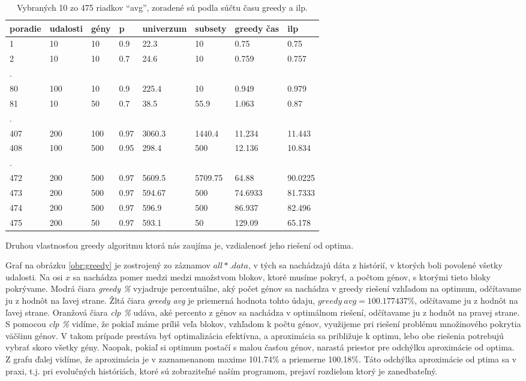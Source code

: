 \begin{table}[t]

\label{tab:data}
\begin{center}
\begin{tabular}{llllllll}
poradie&udalosti&gény&p&univerzum&subsety&greedy čas&ilp\\
\hline
1&10&10&0.9&22.3&10&0.75&0.75\\
2&10&10&0.7&24.6&10&0.759&0.757\\
.\\
80&100&10&0.9&225.4&10&0.949&0.979\\
81&10&50&0.7&38.5&55.9&1.063&0.87\\
.\\
407&200&100&0.97&3060.3&1440.4&11.234&11.443\\
408&100&500&0.95&298.4&500&12.136&10.834\\
.\\
472&200&500&0.97&5609.5&5709.75&64.88&90.0225\\
473&200&500&0.97&594.67&500&74.6933&81.7333\\
474&200&500&0.97&596.9&500&86.937&82.496\\
475&200&50&0.97&593.1&50&129.09&65.178\\
\end{tabular}
\end{center}
\caption{Vybraných 10 zo 475 riadkov ``avg'', zoradené sú podla súčtu času greedy a ilp. }
\end{table}

Druhou vlastnosťou greedy algoritmu ktorá nás zaujíma je, vzdialenosť jeho riešení od optima.

Graf na obrázku \ref{obr:greedy} je zostrojený zo záznamov $all*.data$, v tých sa nachádzajú dáta z histórií,
v ktorých boli povolené všetky udalosti. Na osi $x$ sa nachádza pomer medzi medzi množstvom blokov, ktoré musíme pokryť, a počtom génov,
s ktorými tieto bloky pokrývame. Modrá čiara \emph{greedy \%} vyjadruje percentuálne, 
aký počet génov sa nachádza v greedy riešení vzhľadom na optimum, odčítavame ju z hodnôt na ľavej strane. Žltá čiara \emph{greedy avg} je priemerná hodnota tohto údaju,
$greedy\ avg=100.177437\%$, odčítavame ju z hodnôt na ľavej strane. Oranžová čiara \emph{clp \%} udáva, aké percento z génov sa nachádza v optimálnom riešení,
odčítavame ju z hodnôt na pravej strane. 
S pomocou \emph{clp \%} vidíme, že pokiaľ máme príliš veľa blokov, vzhľadom k počtu génov, využijeme pri riešení problému množinového pokrytia väčšinu génov.
V takom prípade prestáva byť optimalizácia efektívna, a aproximácia sa približuje k optimu, lebo obe riešenia potrebujú vybrať skoro všetky gény.
Naopak, pokiaľ si optimum postačí s malou časťou génov, narastá priestor pre odchýlku aproximácie od optima.
Z grafu ďalej vidíme, že aproximácia je v zaznamenanom maxime 101.74\% a priemerne 100.18\%.
Táto odchýlka aproximácie od ptima sa v praxi, t.j. pri evolučných históriách, ktoré sú zobraziteľné naším programom, prejaví rozdielom ktorý je zanedbateľný.


